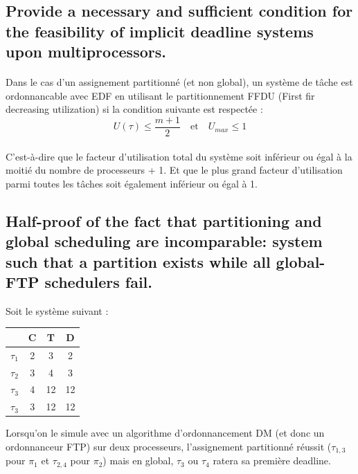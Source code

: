 \subsection{Provide a necessary and sufficient condition for the feasibility of implicit deadline systems upon multiprocessors.}

\paragraph{}
Dans le cas d'un assignement partitionné (et non global), un système de tâche est ordonnancable avec EDF en utilisant le partitionnement FFDU (First fir decreasing utilization) si la condition suivante est respectée :
\begin{equation}
U(\tau) \leq \frac{m+1}{2} \quad \textrm{et} \quad U_{max} \leq 1
\end{equation}
\paragraph{}
C'est-à-dire que le facteur d'utilisation total du système soit inférieur ou égal à la moitié du nombre de processeurs + 1. Et que le plus grand facteur d'utilisation parmi toutes les tâches soit également inférieur ou égal à 1.

\subsection{Half-proof of the fact that partitioning and global scheduling are incomparable: system such that a partition exists while all global-FTP schedulers fail.}
Soit le système suivant :
  \begin{center}
    \begin{tabular}{| l | c | c | c |}
      \hline
                   & C  & T  & D  \\
      \hline
       $\tau_{1}$  & 2  & 3  & 2  \\
      \hline
       $\tau_{2}$  & 3  & 4  & 3  \\
      \hline
       $\tau_{3}$  & 4  & 12 & 12 \\
      \hline       
      $\tau_{3}$  &  3  & 12 & 12 \\
      \hline
  \end{tabular}
  \end{center}
  
Lorsqu'on le simule avec un algorithme d'ordonnancement DM (et donc un ordonnanceur FTP) sur deux processeurs, l'assignement partitionné réussit ($\tau_{1, 3}$ pour $\pi_{1}$ et $\tau_{2,4}$ pour $\pi_{2}$) mais en global, $\tau_{3}$ ou $\tau_{4}$ ratera sa première deadline.
\newpage
